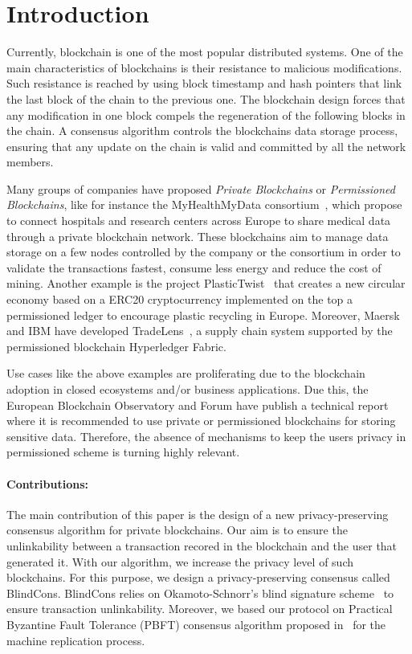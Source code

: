 \documentclass[conference]{llncs}
\newcommand{\name}{BlindCons}
\begin{document}
\section{Introduction} \label{intro}

Currently, blockchain is one of the most popular distributed systems. One of the main characteristics of blockchains is their resistance to malicious modifications. Such resistance is reached by using block timestamp and hash pointers that link the last block of the chain to the previous one. The blockchain design forces that any modification in one block compels the regeneration of the following blocks in the chain. A consensus algorithm controls the blockchains data storage process, ensuring that any update on the chain is valid and committed by all the network members.

Many groups of companies have proposed \emph{Private Blockchains} or \emph{Permissioned Blockchains}, like for instance the MyHealthMyData  consortium~\cite{MHMD}, which propose to connect hospitals and research centers across Europe to share medical data through a private blockchain network. These blockchains aim to manage data storage on a few nodes controlled by the company or the consortium in order to validate the transactions fastest, consume less energy and reduce the cost of mining. Another example is the project PlasticTwist~\cite{PTWIST} that creates a new circular economy based on a ERC20 cryptocurrency implemented on the top a permissioned ledger to encourage plastic recycling in Europe. Moreover, Maersk and IBM have developed TradeLens~\cite{Tradelens}, a supply chain system supported by the permissioned blockchain Hyperledger Fabric.  

Use cases like the above examples are proliferating due to the
blockchain adoption in closed ecosystems and/or business
applications. Due this, the European Blockchain Observatory  and Forum
have publish a technical report~\cite{BlockchainGDPR} where it is
recommended to use private or permissioned blockchains for storing sensitive data. Therefore, the absence of mechanisms to keep the users privacy in permissioned scheme is turning highly relevant.


\paragraph*{Contributions:} The main contribution of this paper is the design of a new privacy-preserving consensus algorithm for private blockchains. Our aim is to ensure the unlinkability between a transaction recored in the blockchain and the user that generated it. With our algorithm, we increase the privacy level of such blockchains. For this purpose, we design a privacy-preserving consensus called \name{}. \name{} relies on Okamoto-Schnorr's blind signature scheme~\cite{okamoto1992provably} to ensure transaction unlinkability. Moreover, we based our protocol on Practical Byzantine Fault Tolerance (PBFT) consensus algorithm proposed in~\cite{castro1999practical} for the machine replication process.
\end{document}
